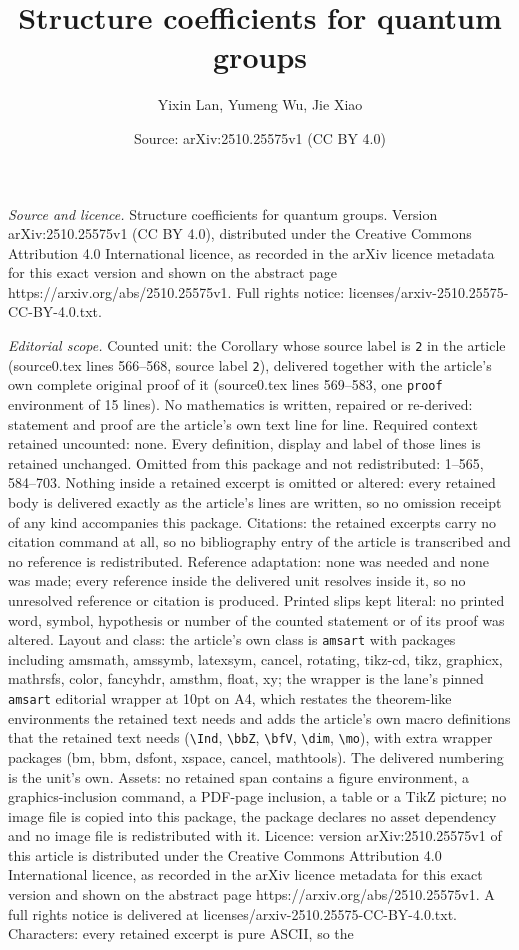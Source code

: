\documentclass[10pt,a4paper]{amsart}
\title[Structure coefficients for quantum groups]{Structure coefficients for quantum groups}
\author{Yixin Lan, Yumeng Wu, Jie Xiao}
\date{Source: arXiv:2510.25575v1 (CC BY 4.0)}
\begin{document}
\maketitle

\noindent\emph{Source and licence.} Structure coefficients for quantum groups. Version arXiv:2510.25575v1 (CC BY 4.0), distributed under the Creative Commons Attribution 4.0 International licence, as recorded in the arXiv licence metadata for this exact version and shown on the abstract page https://arxiv.org/abs/2510.25575v1. Full rights notice: licenses/arxiv-2510.25575-CC-BY-4.0.txt.\par\smallskip

\noindent\textit{Editorial scope.} Counted unit: the Corollary whose source label is \texttt{2} in the article (source0.tex lines 566--568, source label \texttt{2}), delivered together with the article's own complete original proof of it (source0.tex lines 569--583, one \texttt{proof} environment of 15 lines). No mathematics is written, repaired or re-derived: statement and proof are the article's own text line for line. Required context retained uncounted: none. Every definition, display and label of those lines is retained unchanged. Omitted from this package and not redistributed: 1--565, 584--703. Nothing inside a retained excerpt is omitted or altered: every retained body is delivered exactly as the article's lines are written, so no omission receipt of any kind accompanies this package. Citations: the retained excerpts carry no citation command at all, so no bibliography entry of the article is transcribed and no reference is redistributed. Reference adaptation: none was needed and none was made; every reference inside the delivered unit resolves inside it, so no unresolved reference or citation is produced. Printed slips kept literal: no printed word, symbol, hypothesis or number of the counted statement or of its proof was altered. Layout and class: the article's own class is \texttt{amsart} with packages including amsmath, amssymb, latexsym, cancel, rotating, tikz-cd, tikz, graphicx, mathrsfs, color, fancyhdr, amsthm, float, xy; the wrapper is the lane's pinned \texttt{amsart} editorial wrapper at 10pt on A4, which restates the theorem-like environments the retained text needs and adds the article's own macro definitions that the retained text needs (\texttt{\textbackslash Ind}, \texttt{\textbackslash bbZ}, \texttt{\textbackslash bfV}, \texttt{\textbackslash dim}, \texttt{\textbackslash mo}), with extra wrapper packages (bm, bbm, dsfont, xspace, cancel, mathtools). The delivered numbering is the unit's own. Assets: no retained span contains a figure environment, a graphics-inclusion command, a PDF-page inclusion, a table or a TikZ picture; no image file is copied into this package, the package declares no asset dependency and no image file is redistributed with it. Licence: version arXiv:2510.25575v1 of this article is distributed under the Creative Commons Attribution 4.0 International licence, as recorded in the arXiv licence metadata for this exact version and shown on the abstract page https://arxiv.org/abs/2510.25575v1. A full rights notice is delivered at licenses/arxiv-2510.25575-CC-BY-4.0.txt. Characters: every retained excerpt is pure ASCII, so the 
\end{document}

